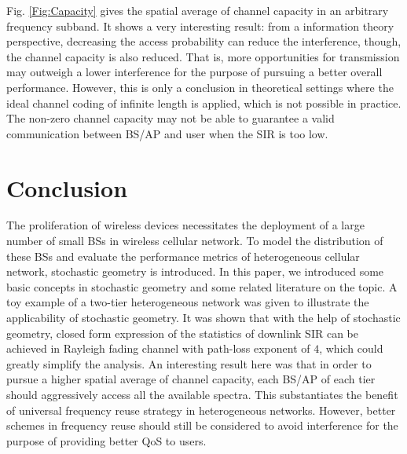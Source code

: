 \documentclass[a4paper,twocolumn]{IEEEtran}
\begin{document}
Fig. \ref{Fig:Capacity} gives the spatial average of channel capacity in an arbitrary frequency subband. It shows a very interesting result: from a information theory perspective, decreasing the access probability can reduce the interference, though, the channel capacity is also reduced. That is, more opportunities for transmission may outweigh a lower interference for the purpose of pursuing a better overall performance. However, this is only a conclusion in theoretical settings where the ideal channel coding of infinite length is applied, which is not possible in practice. The non-zero channel capacity may not be able to guarantee a valid communication between BS/AP and user when the SIR is too low.    
\section{Conclusion}\label{Sec:Con}
The proliferation of wireless devices necessitates the deployment of a large number of small BSs in wireless cellular network. To model the distribution of these BSs and evaluate the performance metrics of heterogeneous cellular network, stochastic geometry is introduced. In this paper, we introduced some basic concepts in stochastic geometry and some related literature on the topic. A toy example of a two-tier heterogeneous network was given to illustrate the applicability of stochastic geometry. It was shown that with the help of stochastic geometry, closed form expression of the statistics of downlink SIR can be achieved in Rayleigh fading channel with path-loss exponent of $4$, which could greatly simplify the analysis. An interesting result here was that in order to pursue a higher spatial average of channel capacity, each BS/AP of each tier should aggressively access all the available spectra. This substantiates the benefit of universal frequency reuse strategy in heterogeneous networks. However, better schemes in frequency reuse should still be considered to avoid interference for the purpose of providing better QoS to users.      


  
\end{document}
